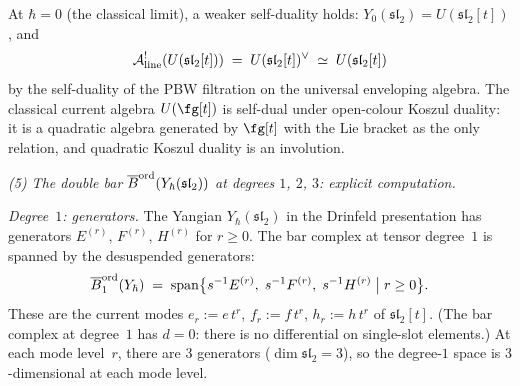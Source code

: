 \begin{computation}
At $\hbar = 0$ (the classical limit), a weaker self-duality
holds: $Y_0(\mathfrak{sl}_2) = U(\mathfrak{sl}_2[t])$, and
\[
\mathcal{A}^!_{\mathrm{line}}(U(\mathfrak{sl}_2[t]))
\;=\;
U(\mathfrak{sl}_2[t])^\vee
\;\simeq\;
U(\mathfrak{sl}_2[t])
\]
by the self-duality of the PBW filtration on the universal
enveloping algebra. The classical current algebra $U(\fg[t])$ is
self-dual under open-colour Koszul duality: it is a quadratic
algebra generated by $\fg[t]$ with the Lie bracket as the only
relation, and quadratic Koszul duality is an involution.

\medskip
\noindent\emph{(5) The double bar
$\overline{B}^{\mathrm{ord}}(Y_\hbar(\mathfrak{sl}_2))$
at degrees $1$, $2$, $3$: explicit computation.}

\emph{Degree~$1$: generators.}\enspace
The Yangian $Y_\hbar(\mathfrak{sl}_2)$ in the Drinfeld
presentation has generators $E^{(r)}$, $F^{(r)}$,
$H^{(r)}$ for $r \ge 0$. The bar complex at tensor
degree~$1$ is spanned by the desuspended generators:
\[
\overline{B}^{\mathrm{ord}}_1(Y_\hbar)
\;=\;
\operatorname{span}\bigl\{
s^{-1}E^{(r)},\;s^{-1}F^{(r)},\;s^{-1}H^{(r)}
\;\big|\;r\ge 0\bigr\}.
\]
These are the current modes
$e_r := e\,t^r$, $f_r := f\,t^r$, $h_r := h\,t^r$ of
$\mathfrak{sl}_2[t]$. (The bar complex at degree~$1$
has $d = 0$: there is no differential on single-slot
elements.) At each mode level~$r$, there are $3$
generators ($\dim\mathfrak{sl}_2 = 3$), so the
degree-$1$ space is $3$-dimensional at each mode level.


\end{computation}
